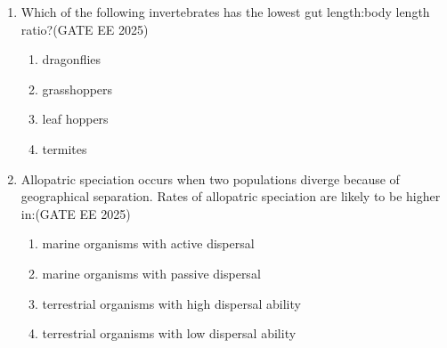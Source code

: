\begin{enumerate}[leftmargin=*,label=\textbf{Q.\arabic*}]
\item Which of the following invertebrates has the lowest gut length:body length ratio?\hfill {(GATE EE 2025)}
\begin{multicols}{2}
\begin{enumerate}
\item dragonflies
\item grasshoppers
\item leaf hoppers
\item termites
\end{enumerate}
\end{multicols}

\item Allopatric speciation occurs when two populations diverge because of geographical separation. Rates of allopatric speciation are likely to be higher in:\hfill {(GATE EE 2025)}

\begin{enumerate}
\item marine organisms with active dispersal
\item marine organisms with passive dispersal
\item terrestrial organisms with high dispersal ability
\item terrestrial organisms with low dispersal ability
\end{enumerate}

\end{enumerate}
